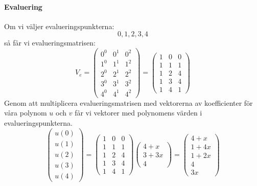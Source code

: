\paragraph{Evaluering}
Om vi väljer evalueringspunkterna:
\begin{equation*}
  0, 1, 2, 3, 4
\end{equation*}
så får vi evalueringsmatrisen:
\begin{equation*}
  V_e = \begin{pmatrix}
    0^0 & 0^1 & 0^2 \\
    1^0 & 1^1 & 1^2 \\
    2^0 & 2^1 & 2^2 \\
    3^0 & 3^1 & 3^2 \\
    4^0 & 4^1 & 4^2
  \end{pmatrix} =
  \begin{pmatrix}
    1 & 0 & 0 \\
    1 & 1 & 1 \\
    1 & 2 & 4 \\
    1 & 3 & 4 \\
    1 & 4 & 1
  \end{pmatrix}
\end{equation*}
Genom att multiplicera evalueringsmatrisen med vektorerna av koefficienter för
våra polynom $u$ och $v$ får vi vektorer med polynomens värden i
evalueringspunkterna.
\begin{equation*}
  \begin{pmatrix}
    u(0) \\
    u(1) \\
    u(2) \\
    u(3) \\
    u(4)
  \end{pmatrix} =
  \begin{pmatrix}
    1 & 0 & 0 \\
    1 & 1 & 1 \\
    1 & 2 & 4 \\
    1 & 3 & 4 \\
    1 & 4 & 1
  \end{pmatrix}
  \begin{pmatrix}
    4 + x \\
    3 + 3x \\
    4
  \end{pmatrix} =
  \begin{pmatrix}
    4 + x \\
    1 + 4x \\
    1 + 2x \\
    4 \\
    3x
  \end{pmatrix}
\end{equation*}
